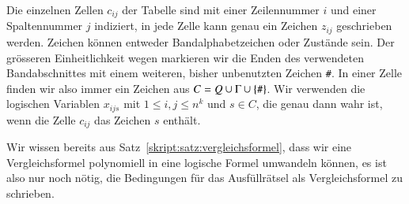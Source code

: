Die einzelnen Zellen $c_{ij}$ der Tabelle sind mit einer Zeilennummer $i$
und einer Spaltennummer $j$ indiziert, in jede Zelle kann
genau ein Zeichen $z_{ij}$ geschrieben werden.
Zeichen können entweder Bandalphabetzeichen oder Zustände sein.
Der grösseren Einheitlichkeit wegen markieren wir die Enden des verwendeten
Bandabschnittes mit einem weiteren, bisher unbenutzten Zeichen {\tt\#}.
In einer Zelle finden wir also immer ein Zeichen aus $C=Q\cup \Gamma\cup\{\text{\tt\#}\}$.
Wir verwenden die logischen
Variablen $x_{ijs}$ mit $1\le i,j\le n^k$ und $s\in C$, die
genau dann wahr ist, wenn die Zelle $c_{ij}$ das Zeichen $s$ enthält.

Wir wissen bereits aus Satz~\ref{skript:satz:vergleichsformel}, dass wir
eine Vergleichsformel polynomiell in eine logische Formel umwandeln
können, es ist also nur noch nötig, die Bedingungen für das Ausfüllrätsel
als Vergleichsformel zu schrieben.


